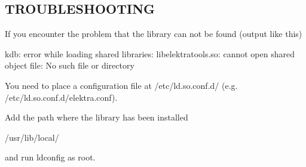 \subsection*{T\+R\+O\+U\+B\+L\+E\+S\+H\+O\+O\+T\+I\+N\+G}

If you encounter the problem that the library can not be found (output like this) \begin{DoxyVerb}    kdb: error while loading shared libraries: libelektratools.so: cannot open shared object file: No such file or directory
\end{DoxyVerb}


You need to place a configuration file at {\ttfamily /etc/ld.so.\+conf.\+d/} (e.\+g. {\ttfamily /etc/ld.so.\+conf.\+d/elektra.conf}).

Add the path where the library has been installed \begin{DoxyVerb}    /usr/lib/local/
\end{DoxyVerb}


and run {\ttfamily ldconfig} as root. 